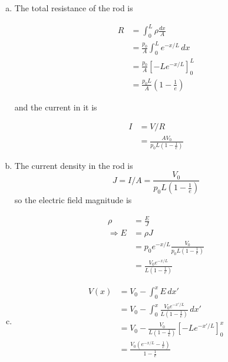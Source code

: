 \documentclass{article}
\begin{document}
\begin{enumerate}[(a)]
  \item The total resistance of the rod is

        \begin{align*}
          R & = \int_0^L \rho \frac{dx}{A}                     \\
            & = \frac{p_0}{A} \int_0^L e^{-x / L} \,dx         \\
            & = \frac{p_0}{A} [-L e^{-x / L}]_0^L              \\
            & = \frac{p_0 L}{A} \left( 1 - \frac{1}{e} \right)
        \end{align*}

        and the current in it is

        \begin{align*}
          I & = V / R                                              \\
            & = \frac{A V_0}{p_0 L \left( 1 - \frac{1}{e} \right)}
        \end{align*}

  \item The current density in the rod is \[J = I / A = \frac{V_0}{p_0 L \left( 1 - \frac{1}{e} \right)}\] so the electric field magnitude is

        \begin{align*}
          \rho          & = \frac{E}{J}                                                     \\
          \Rightarrow E & = \rho J                                                          \\
                        & = p_0 e^{-x / L} \frac{V_0}{p_0 L \left( 1 - \frac{1}{e} \right)} \\
                        & = \frac{V_0 e^{-x / L}}{L \left( 1 - \frac{1}{e} \right)}
        \end{align*}

  \item

        \begin{align*}
          V(x) & = V_0 - \int_0^x E \,dx'                                                        \\
               & = V_0 - \int_0^x \frac{V_0 e^{-x' / L}}{L \left( 1 - \frac{1}{e} \right)} \,dx' \\
               & = V_0 - \frac{V_0}{L \left( 1 - \frac{1}{e} \right)} [-L e^{-x' / L}]_0^x       \\
               & = \frac{V_0 \left( e^{-x / L} - \frac{1}{e} \right)}{1 - \frac{1}{e}}
        \end{align*}
\end{enumerate}
\end{document}
